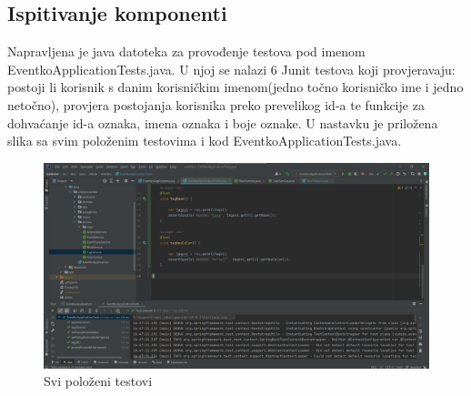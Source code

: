 	
			
			\subsection{Ispitivanje komponenti}
			
			\indent Napravljena je java datoteka za provođenje testova pod imenom EventkoApplicationTests.java. U njoj se nalazi 6 Junit testova koji provjeravaju: postoji li korisnik s danim korisničkim imenom(jedno točno korisničko ime i jedno netočno), provjera postojanja korisnika preko prevelikog id-a te funkcije za dohvaćanje id-a oznaka, imena oznaka i boje oznake. U nastavku je priložena slika sa svim položenim testovima i kod EventkoApplicationTests.java.
			
			
			\begin{figure}[H]
				\includegraphics[width=\textwidth]{Slike/TestoviProsli.png}
				\caption{Svi položeni testovi}
			\end{figure}
			
